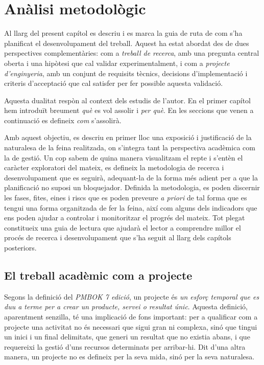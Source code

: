 
\chapter{Anàlisi metodològic}\label{analisi}

Al llarg del present capítol es descriu i es marca la guia de ruta de com s'ha planificat el desenvolupament del treball. Aquest ha estat abordat des de dues perspectives complementàries: com a \emph{treball de recerca}, amb una pregunta central oberta i una hipòtesi que cal validar experimentalment, i com a \emph{projecte d'enginyeria}, amb un conjunt de requisits tècnics, decisions d'implementació i criteris d'acceptació que cal satisfer per fer possible aquesta validació.

Aquesta dualitat respòn al context dels estudis de l'autor. En el primer capítol hem introduït breument \emph{què} es vol assolir i \emph{per què}. En les seccions que venen a continuació es defineix \emph{com} s'assolirà. 

Amb aquest objectiu, es descriu en primer lloc una exposició i justificació de la naturalesa de la feina realitzada, on s'integra tant la perspectiva acadèmica com la de gestió. Un cop sabem de quina manera visualitzam el repte i s'entèn el caràcter exploratori del mateix, es defineix la metodologia de recerca i desenvolupament que es seguirà, adequant-la de la forma més adient per a que la planificació no suposi un bloquejador. Definida la metodologia, es poden discernir les fases, fites, eines i riscs que es poden preveure \emph{a priori} de tal forma que es tengui una forma organitzada de fer la feina, així com alguns dels indicadors que ens poden ajudar a controlar i monitoritzar el progrés del mateix. Tot plegat constitueix una guia de lectura que ajudarà el lector a comprendre millor el procés de recerca i desenvolupament que s'ha seguit al llarg dels capítols posteriors.

\section{El treball acadèmic com a projecte}
Segons la definició del \emph{PMBOK 7\textordfeminine{} edició}, un projecte és \emph{un esforç temporal que es duu a terme per a crear un producte, servei o resultat únic}. Aquesta definició, aparentment senzilla, té una implicació de fons important: per a qualificar com a projecte una activitat no és necessari que sigui gran ni complexa, sinó que tingui un inici i un final delimitats, que generi un resultat que no existia abans, i que requereixi la gestió d'uns recursos determinats per arribar-hi. Dit d'una altra manera, un projecte no es defineix per la seva mida, sinó per la seva naturalesa.

